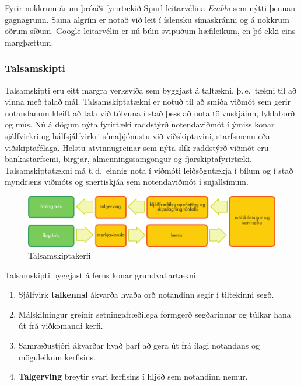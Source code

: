 \begin{multicols}{2}
Fyrir nokkrum árum þróaði fyrirtækið Spurl leitarvélina \textit{Emblu} sem nýtti þennan gagnagrunn. Sama algrím er notað við leit í íslensku símaskránni og á nokkrum öðrum síðum. Google leitarvélin er nú búin svipuðum hæfileikum, en þó ekki eins margþættum.
  
\subsubsection{Talsamskipti}

Talsamskipti eru eitt margra verksviða sem byggjast á taltækni, þ.\,e.~tækni til að vinna með talað mál. Talsamskiptatækni er notuð til að smíða viðmót sem gerir notandanum kleift að tala við tölvuna í stað þess að nota tölvuskjáinn, lyklaborð og mús. Nú á dögum nýta fyrirtæki raddstýrð notendaviðmót í ýmiss konar sjálfvirkri og hálfsjálfvirkri símaþjónustu við viðskiptavini, starfsmenn eða viðskiptafélaga. Helstu atvinnugreinar sem nýta slík raddstýrð viðmót eru bankastarfsemi, birgjar, almenningssamgöngur og fjarskiptafyrirtæki. Talsamskiptatækni má t.\,d.~einnig nota í viðmóti leiðsögutækja í bílum og í stað myndræns viðmóts og snertiskjáa sem notendaviðmót í snjallsímum. 

\begin{figure}[htb]
  \center 
  \includegraphics[width=\textwidth]{../_media/icelandic/simple_speech-based_dialogue_architecture}
  \caption{Talsamskiptakerfi}
  \label{fig:dialoguearch_is}
\end{figure}

Talsamskipti byggjast á ferns konar grundvallartækni:

\begin{enumerate}
\item Sjálfvirk \textbf{talkennsl} ákvarða hvaða orð notandinn segir í tiltekinni segð. 
\item Málskilningur greinir setningafræðilega formgerð segðarinnar og túlkar hana út frá viðkomandi kerfi.
\item Samræðustjóri ákvarðar hvað þarf að gera út frá ílagi notandans og möguleikum kerfisins.
\item \textbf{Talgerving} breytir svari kerfisins í hljóð sem notandinn nemur. 
\end{enumerate}


\end{multicols}
